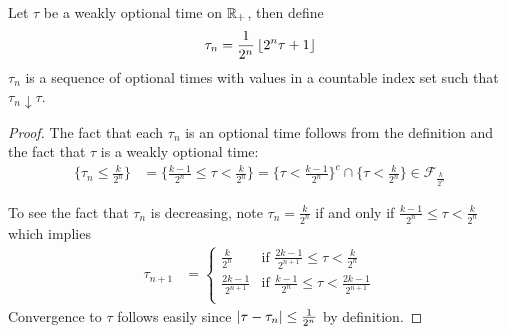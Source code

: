 \begin{lem}\label{DiscreteApproximationOptionalTimes}Let $\tau$ be a weakly optional time on $\mathbb{R}_+$, then define
\begin{align*}
\tau_n = \frac{1}{2^n} \left \lfloor 2^n \tau + 1 \right \rfloor
\end{align*}
$\tau_n$ is a sequence of optional times with values in a
countable index set such that $\tau_n\downarrow \tau$.
\end{lem}
\begin{proof}
The fact that each $\tau_n$ is an optional time follows from the
definition and the fact that $\tau$ is a weakly optional time:
\begin{align*}
\lbrace \tau_n \leq \frac{k}{2^n} \rbrace &= \lbrace \frac{k-1}{2^n}
\leq \tau < \frac{k}{2^n} \rbrace = \lbrace \tau < \frac{k-1}{2^n}
\rbrace^c \cap \lbrace
\tau < \frac{k}{2^n} \rbrace \in \mathcal{F}_{\frac{k}{2^n}}
\end{align*}

To see the fact that $\tau_n$ is decreasing, note $\tau_n =
\frac{k}{2^n}$ if and only if $\frac{k-1}{2^n} \leq \tau <
\frac{k}{2^n}$  
which implies 
\begin{align*}
\tau_{n+1} &= \begin{cases}
\frac{k}{2^n} & \text{if $\frac{2k-1}{2^{n+1}} \leq \tau < \frac{k}{2^n}$} \\
\frac{2k-1}{2^{n+1}} & \text{if $\frac{k-1}{2^{n}} \leq \tau < \frac{2k-1}{2^{n+1}}$} \\
\end{cases}
\end{align*}
Convergence to $\tau$ follows easily since $\left \vert \tau - \tau_n \right \vert \leq \frac{1}{2^n}$ by definition.
\end{proof}

